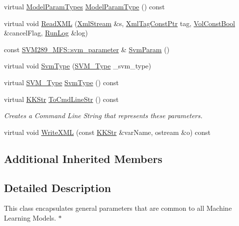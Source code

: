 \begin{DoxyCompactItemize}
\item 
virtual \hyperlink{class_k_k_m_l_l_1_1_model_param_a5984a5fe225fdbe8e40fb5ec746a42d0}{Model\+Param\+Types} \hyperlink{class_k_k_m_l_l_1_1_model_param_svm_base_aef389b1a5bb7a67c946a5d055daa3549}{Model\+Param\+Type} () const 
\item 
virtual void \hyperlink{class_k_k_m_l_l_1_1_model_param_svm_base_a80074942967119640114a0e27b18a4c9}{Read\+X\+ML} (\hyperlink{class_k_k_b_1_1_xml_stream}{Xml\+Stream} \&s, \hyperlink{namespace_k_k_b_a5f1b0b1667d79fec26deeff10c43df23}{Xml\+Tag\+Const\+Ptr} tag, \hyperlink{namespace_k_k_b_a7d390f568e2831fb76b86b56c87bf92f}{Vol\+Const\+Bool} \&cancel\+Flag, \hyperlink{class_k_k_b_1_1_run_log}{Run\+Log} \&log)
\item 
const \hyperlink{struct_s_v_m289___m_f_s_1_1svm__parameter}{S\+V\+M289\+\_\+\+M\+F\+S\+::svm\+\_\+parameter} \& \hyperlink{class_k_k_m_l_l_1_1_model_param_svm_base_a5d2a9e1e1ef64f6f764fdd80ac7e9640}{Svm\+Param} ()
\item 
virtual void \hyperlink{class_k_k_m_l_l_1_1_model_param_svm_base_ac1823f50e1777c0531828e7b59246a4a}{Svm\+Type} (\hyperlink{namespace_s_v_m289___m_f_s_ace392faef6440cf56ebff6b360e7d72a}{S\+V\+M\+\_\+\+Type} \+\_\+svm\+\_\+type)
\item 
virtual \hyperlink{namespace_s_v_m289___m_f_s_ace392faef6440cf56ebff6b360e7d72a}{S\+V\+M\+\_\+\+Type} \hyperlink{class_k_k_m_l_l_1_1_model_param_svm_base_a683311de55910a8e3b1b069957bff77e}{Svm\+Type} () const 
\item 
virtual \hyperlink{class_k_k_b_1_1_k_k_str}{K\+K\+Str} \hyperlink{class_k_k_m_l_l_1_1_model_param_svm_base_a9984261fa1a40e128d1abfa380ffe885}{To\+Cmd\+Line\+Str} () const 
\begin{DoxyCompactList}\small\item\em Creates a Command Line String that represents these parameters. \end{DoxyCompactList}\item 
virtual void \hyperlink{class_k_k_m_l_l_1_1_model_param_svm_base_a7d54f5563c5df6fa2073cc4a69e54e7f}{Write\+X\+ML} (const \hyperlink{class_k_k_b_1_1_k_k_str}{K\+K\+Str} \&var\+Name, ostream \&o) const 
\end{DoxyCompactItemize}
\subsection*{Additional Inherited Members}


\subsection{Detailed Description}
This class encapsulates general parameters that are common to all Machine Learning Models. $\ast$

